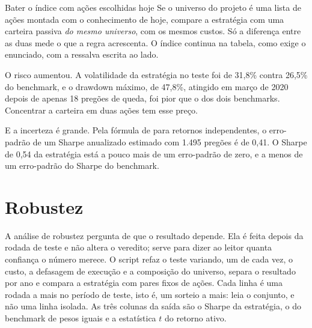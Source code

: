 \begin{armadilha}{Bater o índice com ações escolhidas hoje}
Se o universo do projeto é uma lista de ações montada com o conhecimento de hoje, compare a estratégia com uma carteira passiva \emph{do mesmo universo}, com os mesmos custos. Só a diferença entre as duas mede o que a regra acrescenta. O índice continua na tabela, como exige o enunciado, com a ressalva escrita ao lado.
\end{armadilha}

O risco aumentou. A volatilidade da estratégia no teste foi de 31,8\% contra 26,5\% do benchmark, e o drawdown máximo, de 47,8\%, atingido em março de 2020 depois de apenas 18 pregões de queda, foi pior que o dos dois benchmarks. Concentrar a carteira em duas ações tem esse preço.

E a incerteza é grande. Pela fórmula de \citet{lo2002} para retornos independentes, o erro-padrão de um Sharpe anualizado estimado com 1.495 pregões é de 0,41. O Sharpe de 0,54 da estratégia está a pouco mais de um erro-padrão de zero, e a menos de um erro-padrão do Sharpe do benchmark.

\section{Robustez}
\label{sec:c15-robustez}

A análise de robustez pergunta de que o resultado depende. Ela é feita depois da rodada de teste e não altera o veredito; serve para dizer ao leitor quanta confiança o número merece. O script  refaz o teste variando, um de cada vez, o custo, a defasagem de execução e a composição do universo, separa o resultado por ano e compara a estratégia com pares fixos de ações. Cada linha é uma rodada a mais no período de teste, isto é, um sorteio a mais: leia o conjunto, e não uma linha isolada. As três colunas da saída são o Sharpe da estratégia, o do benchmark de pesos iguais e a estatística $t$ do retorno ativo.

